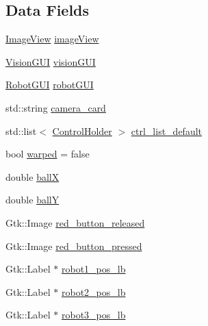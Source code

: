 \subsection*{Data Fields}
\begin{DoxyCompactItemize}
\item 
\hyperlink{class_image_view}{Image\+View} \hyperlink{class_v_s_s_s___g_u_i_1_1_v4_l_interface_a2c99f4d9fad8a34fa98d5b61beb06745}{image\+View}
\item 
\hyperlink{class_vision_g_u_i}{Vision\+G\+UI} \hyperlink{class_v_s_s_s___g_u_i_1_1_v4_l_interface_a7a2432ad62a960423bc3370abe5c8930}{vision\+G\+UI}
\item 
\hyperlink{class_robot_g_u_i}{Robot\+G\+UI} \hyperlink{class_v_s_s_s___g_u_i_1_1_v4_l_interface_ad7fa1969bc6892bad70672aacaa960c7}{robot\+G\+UI}
\item 
std\+::string \hyperlink{class_v_s_s_s___g_u_i_1_1_v4_l_interface_a7842aff21c2c295a77e75567ff50f25c}{camera\+\_\+card}
\item 
std\+::list$<$ \hyperlink{namespace_v_s_s_s___g_u_i_a9eff2f5504f050458ee4bcf362482a8d}{Control\+Holder} $>$ \hyperlink{class_v_s_s_s___g_u_i_1_1_v4_l_interface_a97faf21f7b67c8ef15ceeafa377c6ea4}{ctrl\+\_\+list\+\_\+default}
\item 
bool \hyperlink{class_v_s_s_s___g_u_i_1_1_v4_l_interface_ac87d2ec65167aae1177178f6bffce0ed}{warped} = false
\item 
double \hyperlink{class_v_s_s_s___g_u_i_1_1_v4_l_interface_a41a7395305cf41b91cdadee1f6c4d94b}{ballX}
\item 
double \hyperlink{class_v_s_s_s___g_u_i_1_1_v4_l_interface_af81f6cd160e4b1331cbbec6f907c2856}{ballY}
\item 
Gtk\+::\+Image \hyperlink{class_v_s_s_s___g_u_i_1_1_v4_l_interface_aadf59dd8bae5ef012842bdab1bef100d}{red\+\_\+button\+\_\+released}
\item 
Gtk\+::\+Image \hyperlink{class_v_s_s_s___g_u_i_1_1_v4_l_interface_a095096c714eef1dde0abc7a0eca41d06}{red\+\_\+button\+\_\+pressed}
\item 
Gtk\+::\+Label $\ast$ \hyperlink{class_v_s_s_s___g_u_i_1_1_v4_l_interface_a568a4223fbff21740c879e612f903bf8}{robot1\+\_\+pos\+\_\+lb}
\item 
Gtk\+::\+Label $\ast$ \hyperlink{class_v_s_s_s___g_u_i_1_1_v4_l_interface_a4401b4de30c4134d0b4633fd84a72c69}{robot2\+\_\+pos\+\_\+lb}
\item 
Gtk\+::\+Label $\ast$ \hyperlink{class_v_s_s_s___g_u_i_1_1_v4_l_interface_af1ed96270d6374c90adfe86c37b1da3a}{robot3\+\_\+pos\+\_\+lb}

\end{DoxyCompactItemize}
